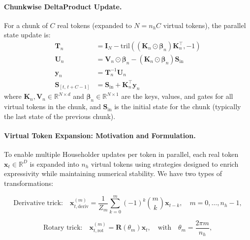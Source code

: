 \documentclass[10pt,a4paper]{article}
\begin{document}
\paragraph{Chunkwise DeltaProduct Update.}

For a chunk of $C$ real tokens (expanded to $N = n_h C$ virtual tokens), the parallel state update is:
\begin{align}
    \mathbf{T}_n &= \mathbf{I}_N - \mathrm{tril}\left((\mathbf{K}_n \odot \boldsymbol{\beta}_n) \mathbf{K}_n^\top, -1\right) \label{eq:triangular-nh} \\
    \mathbf{U}_n &= \mathbf{V}_n \odot \boldsymbol{\beta}_n - (\mathbf{K}_n \odot \boldsymbol{\beta}_n) \mathbf{S}_{\mathrm{in}} \\
    \mathbf{y}_n &= \mathbf{T}_n^{-1} \mathbf{U}_n \\
    \mathbf{S}_{[t,\,t+C-1]} &= \mathbf{S}_{\mathrm{in}} + \mathbf{K}_n^\top \mathbf{y}_n
    \label{eq:chunk-deltaproduct}
\end{align}
where $\mathbf{K}_n, \mathbf{V}_n \in \mathbb{R}^{N \times d}$ and $\boldsymbol{\beta}_n \in \mathbb{R}^{N \times 1}$ are the keys, values, and gates for all virtual tokens in the chunk, and $\mathbf{S}_{\mathrm{in}}$ is the initial state for the chunk (typically the last state of the previous chunk).



\paragraph{Virtual Token Expansion: Motivation and Formulation.}

To enable multiple Householder updates per token in parallel, each real token $\mathbf{x}_t \in \mathbb{R}^D$ is expanded into $n_h$ virtual tokens using strategies designed to enrich expressivity while maintaining numerical stability. We have two types of transformations:

\begin{equation}
    \text{Derivative trick:} \quad \mathbf{x}_{t,\mathrm{deriv}}^{(m)} = \frac{1}{Z_m} \sum_{k=0}^m (-1)^k \binom{m}{k} \mathbf{x}_{t-k}, \quad m=0,\ldots,n_h - 1,
    \label{eq:derivative-trick}
\end{equation}

\begin{equation}
    \text{Rotary trick:} \quad \mathbf{x}_{t,\mathrm{rot}}^{(m)} = \mathbf{R}(\theta_m) \mathbf{x}_t, \quad \text{with} \quad \theta_m = \frac{2\pi m}{n_h},
    \label{eq:rotative-trick}
\end{equation}
\end{document}
